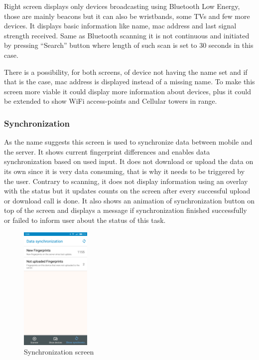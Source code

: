 Right screen displays only devices broadcasting using Bluetooth Low Energy, those are mainly beacons but it can also be wristbands, some TVs and few more devices. It displays basic information like name, mac address and last signal strength received. Same as Bluetooth scanning it is not continuous and initiated by pressing \enquote{Search} button where length of such scan is set to 30 seconds in this case.

There is a possibility, for both screens, of device not having the name set and if that is the case, mac address is displayed instead of a missing name. To make this screen more viable it could display more information about devices, plus it could be extended to show WiFi access-points and Cellular towers in range.

\subsubsection{Synchronization}\label{subsec:Synchronization}
As the name suggests this screen is used to synchronize data between mobile and the server. It shows current fingerprint differences and enables data synchronization based on used input. It does not download or upload the data on its own since it is very data consuming, that is why it needs to be triggered by the user. Contrary to scanning, it does not display information using an overlay with the status but it updates counts on the screen after every successful upload or download call is done. It also shows an animation of synchronization button on top of the screen and displays a message if synchronization finished successfully or failed to inform user about the status of this task.

\begin{figure}[H]
	\begin{centering}
		\includegraphics[width=0.3\textwidth]{img/synchronization}
		\par\end{centering}
	\caption{Synchronization screen}
	\label{fig08c05}
\end{figure}

